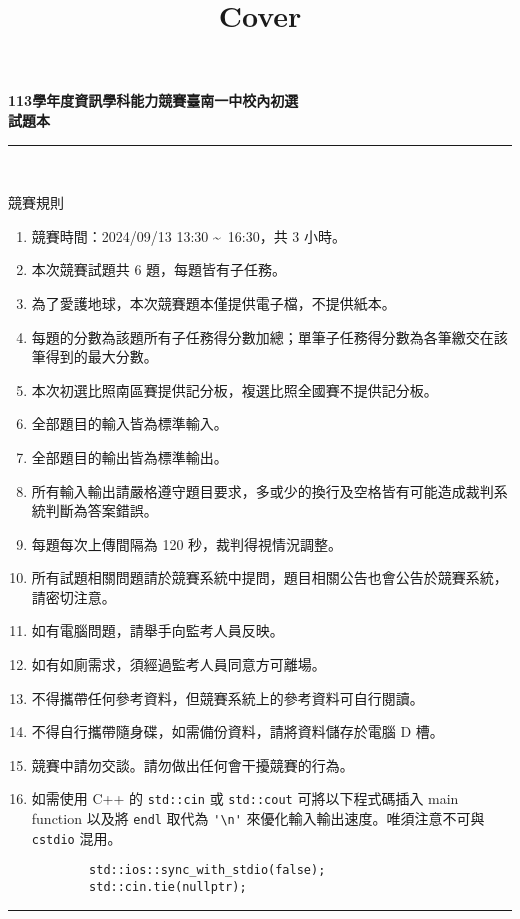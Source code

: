 \documentclass[a4paper]{article}
\title{Cover}
\begin{document}
\begin{center}
\textbf{\huge 113學年度資訊學科能力競賽臺南一中校內初選}\\
\vspace{5mm}
\textbf{\huge 試題本}\\
\vspace{10mm}
\rule{17cm}{2pt}\\
\vspace{5mm}

\huge 競賽規則\\
\end{center}

\fontsize{14pt}{20pt}\selectfont
\begin{enumerate}
    \setlength\itemsep{0.5pt}
    \item 競賽時間：2024/09/13 13:30 \textasciitilde \, 16:30，共 3 小時。
    \item 本次競賽試題共 6 題，每題皆有子任務。
    \item 為了愛護地球，本次競賽題本僅提供電子檔，不提供紙本。
    \item 每題的分數為該題所有子任務得分數加總；單筆子任務得分數為各筆繳交在該筆得到的最大分數。
    \item 本次初選比照南區賽提供記分板，複選比照全國賽不提供記分板。
    \item 全部題目的輸入皆為標準輸入。
    \item 全部題目的輸出皆為標準輸出。
    \item 所有輸入輸出請嚴格遵守題目要求，多或少的換行及空格皆有可能造成裁判系統判斷為答案錯誤。
    \item 每題每次上傳間隔為 120 秒，裁判得視情況調整。
    \item 所有試題相關問題請於競賽系統中提問，題目相關公告也會公告於競賽系統，請密切注意。
    \item 如有電腦問題，請舉手向監考人員反映。
    \item 如有如廁需求，須經過監考人員同意方可離場。
    \item 不得攜帶任何參考資料，但競賽系統上的參考資料可自行閱讀。
    \item 不得自行攜帶隨身碟，如需備份資料，請將資料儲存於電腦 D 槽。
    \item 競賽中請勿交談。請勿做出任何會干擾競賽的行為。
    \item 如需使用 C++ 的 \lstinline{std::cin} 或 \lstinline{std::cout} 可將以下程式碼插入 main function 以及將 \lstinline{endl} 取代為 \lstinline{'\n'} 來優化輸入輸出速度。唯須注意不可與 \lstinline{cstdio} 混用。
        \begin{lstlisting}
        std::ios::sync_with_stdio(false);
        std::cin.tie(nullptr);
        \end{lstlisting}

\end{enumerate}

\begin{center}
\rule{17cm}{2pt}\\
\end{center}
\end{document}

